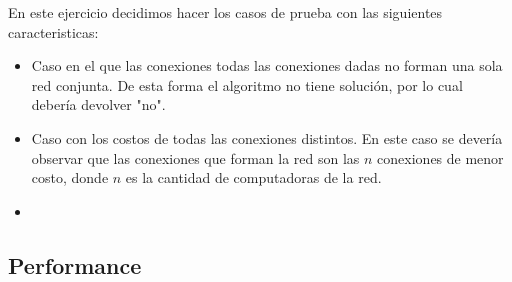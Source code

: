 En este ejercicio decidimos hacer los casos de prueba con las siguientes caracteristicas:

\begin{itemize}
\item Caso en el que las conexiones todas las conexiones dadas no forman una sola red conjunta. De esta forma el algoritmo no tiene solución, por lo cual debería devolver "no".
\item Caso con los costos de todas las conexiones distintos. En este caso se devería observar que las conexiones que forman la red son las $n$ conexiones de menor costo, donde $n$ es la cantidad de computadoras de la red.
\item 
\end{itemize}


\newpage

\subsection{Performance}


